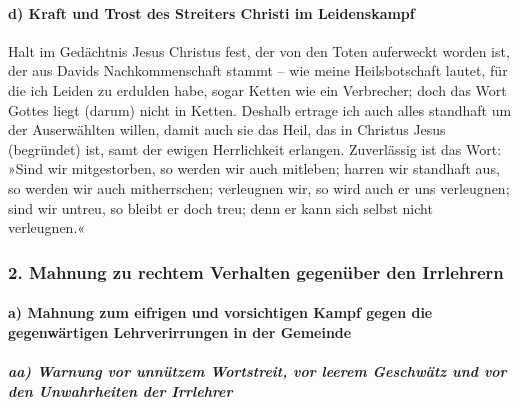 \hypertarget{d-kraft-und-trost-des-streiters-christi-im-leidenskampf}{%
\paragraph{d) Kraft und Trost des Streiters Christi im
Leidenskampf}\label{d-kraft-und-trost-des-streiters-christi-im-leidenskampf}}

 Halt im Gedächtnis Jesus Christus fest, der von den Toten
auferweckt worden ist, der aus Davids Nachkommenschaft stammt -- wie
meine Heilsbotschaft lautet,  für die ich Leiden zu
erdulden habe, sogar Ketten wie ein Verbrecher; doch das Wort Gottes
liegt (darum) nicht in Ketten.  Deshalb ertrage ich auch
alles standhaft um der Auserwählten willen, damit auch sie das Heil, das
in Christus Jesus (begründet) ist, samt der ewigen Herrlichkeit
erlangen.  Zuverlässig ist das Wort: »Sind wir
mitgestorben, so werden wir auch mitleben;  harren wir
standhaft aus, so werden wir auch mitherrschen; verleugnen wir, so wird
auch er uns verleugnen;  sind wir untreu, so bleibt er
doch treu; denn er kann sich selbst nicht verleugnen.«

\hypertarget{mahnung-zu-rechtem-verhalten-gegenuxfcber-den-irrlehrern}{%
\subsubsection{2. Mahnung zu rechtem Verhalten gegenüber den
Irrlehrern}\label{mahnung-zu-rechtem-verhalten-gegenuxfcber-den-irrlehrern}}

\hypertarget{a-mahnung-zum-eifrigen-und-vorsichtigen-kampf-gegen-die-gegenwuxe4rtigen-lehrverirrungen-in-der-gemeinde}{%
\paragraph{a) Mahnung zum eifrigen und vorsichtigen Kampf gegen die
gegenwärtigen Lehrverirrungen in der
Gemeinde}\label{a-mahnung-zum-eifrigen-und-vorsichtigen-kampf-gegen-die-gegenwuxe4rtigen-lehrverirrungen-in-der-gemeinde}}

\hypertarget{aa-warnung-vor-unnuxfctzem-wortstreit-vor-leerem-geschwuxe4tz-und-vor-den-unwahrheiten-der-irrlehrer}{%
\subparagraph{aa) Warnung vor unnützem Wortstreit, vor leerem Geschwätz
und vor den Unwahrheiten der
Irrlehrer}\label{aa-warnung-vor-unnuxfctzem-wortstreit-vor-leerem-geschwuxe4tz-und-vor-den-unwahrheiten-der-irrlehrer}}

